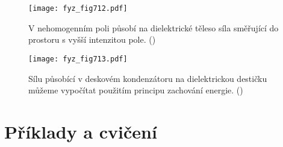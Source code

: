     \begin{figure}[ht!] %
      \centering
      \texttt{[image: fyz\_fig712.pdf]}
      \caption{V nehomogenním poli působí na dielektrické těleso síla směřující do prostoru s vyšší
              intenzitou pole. (\cite[s.~184]{Feynman02})}
      \label{fyz:fig712}
    \end{figure}

    \begin{figure}[ht!] %
      \centering
      \texttt{[image: fyz\_fig713.pdf]}
      \caption{Sílu působící v deskovém kondenzátoru na dielektrickou destičku můžeme vypočítat
               použitím principu zachování energie. (\cite[s.~707]{Feynman02})}
      \label{fyz:fig713}
    \end{figure}

  \section{Příklady a cvičení}\label{fyz:IIchapXsecVI}



